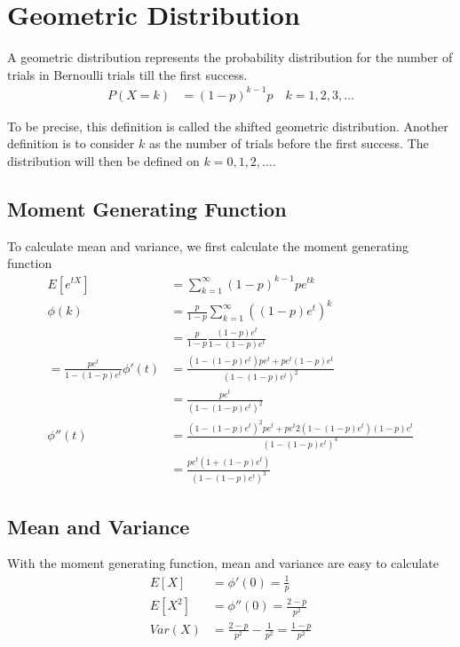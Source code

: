 \documentclass[../../probability-notes.tex]{subfiles}
\begin{document}
    \section{Geometric Distribution}
    A geometric distribution represents the probability distribution for the number of trials in Bernoulli trials till the first success.
    \begin{align*}
        P(X = k) &= (1-p)^{k-1}p \quad k = 1, 2, 3, \ldots
    \end{align*}

    To be precise, this definition is called the shifted geometric distribution. Another definition is to consider $k$ as the number of trials before the first success. The distribution will then be defined on $k = 0, 1, 2, \ldots$.

    \subsection{Moment Generating Function}
    To calculate mean and variance, we first calculate the moment generating function
    \begin{align*}
        E[e^{tX}] &= \sum_{k=1}^{\infty} (1-p)^{k-1}p e^{tk}\\
        \phi(k) &= \frac{p}{1-p} \sum_{k=1}^{\infty} ((1-p)e^{t})^{k}\\
        &= \frac{p}{1-p} \frac{(1-p)e^{t}}{1 - (1-p)e^{t}}\\ = \frac{pe^{t}}{1 - (1-p)e^{t}}
        \phi'(t) &= \frac{(1 - (1-p)e^{t})pe^{t} + pe^{t}(1-p)e^{t}}{(1 - (1-p)e^{t})^{2}}\\
        &= \frac{pe^{t}}{(1 - (1-p)e^{t})^{2}}\\
        \phi''(t) &= \frac{(1 - (1-p)e^{t})^{2}pe^{t} + pe^{t}2(1 - (1-p)e^{t})(1-p)e^{t}}{(1 - (1-p)e^{t})^{4}}\\
        &= \frac{pe^{t}(1 + (1-p)e^{t})}{(1 - (1-p)e^{t})^{3}}
    \end{align*}

    \subsection{Mean and Variance}
    With the moment generating function, mean and variance are easy to calculate
    \begin{align*}
        E[X] &= \phi'(0) = \frac{1}{p}\\
        E[X^{2}] &= \phi''(0) = \frac{2-p}{p^{2}}\\
        Var(X) &= \frac{2-p}{p^{2}} - \frac{1}{p^{2}} = \frac{1-p}{p^{2}}
    \end{align*}
\end{document}
